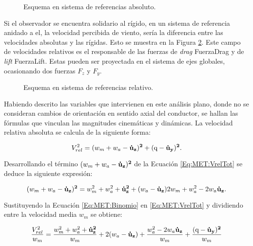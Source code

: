 \begin{figure}[htbp]
	\centering
	\def\svgwidth{60mm}
	
	\caption{Esquema en sistema de referencias absoluto.}
	\label{fig:MET:Viento:VelAbs}
\end{figure}

Si el observador se encuentra solidario al rígido, en un sistema de referencia anidado a el, la velocidad percibida de viento, sería la diferencia entre las velocidades absolutas y las rígidas. Esto se muestra en la Figura \ref{fig:MET:Viento:VelRel}. Este campo de velocidades relativos es el responsable de las fuerzas de \textit{drag} \gls{FuerzaDrag} y  de \textit{lift} \gls{FuerzaLift}. Estas pueden ser proyectada en el sistema de ejes globales, ocasionando dos fuerzas $F_z$ y $F_y$.


\begin{figure}[htbp]
	\centering
	\def\svgwidth{80mm}
	
	\caption{Esquema en sistema de referencias relativo.}
	\label{fig:MET:Viento:VelRel}
\end{figure}

Habiendo descrito las variables que intervienen en este análisis plano, donde no se consideran cambios de orientación en sentido axial del conductor, se hallan las fórmulas que vinculan las magnitudes cinemáticas y dinámicas. La velocidad relativa absoluta se calcula de la siguiente forma:

\begin{equation}
	\label{Eq:MET:VrelTot}
	V_{rel}^2=(w_m+w_a-\bf{\dot{u}}_{z})^2+(\text{q}-\bf{\dot{u}}_{y})^2.
\end{equation}

Desarrollando el término $(w_m+w_a-\bf{\dot{u}}_{z})^2$ de la Ecuación \eqref{Eq:MET:VrelTot} se deduce la siguiente expresión:

\begin{equation}
\label{Eq:MET:Binomio}
	(w_m+w_a-\bf{\dot{u}}_{z})^2= \text{$w_m^2+w_a^2$} + \bf{\dot{u}}_{z}^2 +  (\text{$w_a $} - \bf{\dot{u}}_{z})\text{$2w_m $}  +\text{$w_a^2$}- \text{$2w_a $} \bf{\dot{u}}_{z}. 
\end{equation}

Sustituyendo la Ecuación \eqref{Eq:MET:Binomio} en \eqref{Eq:MET:VrelTot} y dividiendo entre la velocidad media $w_m$ se obtiene:

\begin{equation}
\label{Eq:MET:Binomio}
\frac{V_{rel}^2}{w_m}=\frac{\text{$w_m^2+w_a^2$} + \bf{\dot{u}}_{z}^2}{w_m}  +  2(\text{$w_a $} - \bf{\dot{u}}_{z}) + \frac{\text{$w_a^2$}- \text{$2w_a $} \bf{\dot{u}}_{z}}{\text{$w_m$}}+ \frac{(\text{q}-\bf{\dot{u}}_{y})^2 }{\text{$w_m$}}
\end{equation}


